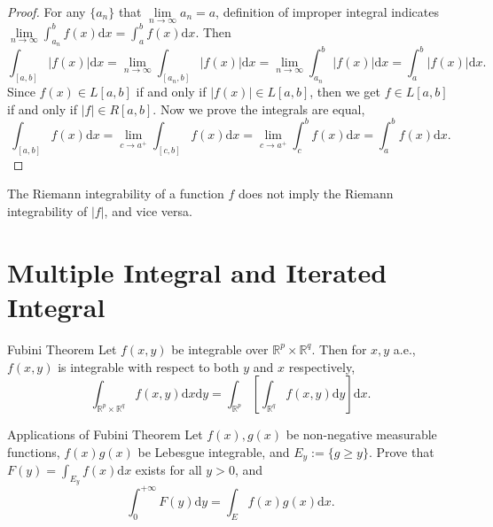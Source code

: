\begin{proof}
  For any $\{a_n\}$ that $\lim \limits _{n \rightarrow \infty} a_n = a$,
  definition of improper integral indicates
  $\lim \limits _{n \rightarrow \infty} \int_{a_n}^b f(x)\mathrm{d} x = \int_a^b f(x)\mathrm{d} x$.
  Then
  \begin{equation}
    \int_{[a, b]} |f(x)|\mathrm{d} x = \lim \limits _{n \rightarrow \infty} \int_{[a_n, b]} |f(x)|\mathrm{d} x
    = \lim \limits _{n \rightarrow \infty} \int_{a_n}^b |f(x)|\mathrm{d} x = \int_a^b |f(x)| \mathrm{d} x.
  \end{equation}
  Since $f(x) \in L[a, b]$ if and only if $|f(x)| \in L[a, b]$, then we get $f \in L[a,b]$ if and only if $|f| \in R[a,b]$.
  Now we prove the integrals are equal,
  \begin{equation}
    \int_{[a,b]}f(x)\mathrm{d} x= \lim \limits _{c \rightarrow a^+} \int_{[c,b]}f(x)\mathrm{d} x
    = \lim \limits _{c \rightarrow a^+}\int_c^b f(x)\mathrm{d} x = \int_a^b f(x)\mathrm{d} x.
  \end{equation}
\end{proof}

\begin{note}
  The Riemann integrability of a function $f$ does not imply the Riemann integrability of $|f|$,
  and vice versa.
\end{note}

\section{Multiple Integral and Iterated Integral}

\begin{theorem}{Fubini Theorem}{}
  Let $f(x, y)$ be integrable over $\mathbb{R}^p \times \mathbb{R}^q$. Then
  for $x, y$ a.e., $f(x,y)$ is integrable with respect to both $y$ and $x$
  respectively,
  \begin{equation}
    \int_{\mathbb{R}^p \times \mathbb{R}^q} f(x,y)\mathrm{d} x\mathrm{d}y 
    = \int_{\mathbb{R}^p} \left[ \int_{\mathbb{R}^q} f(x,y)\mathrm{d} y \right]\mathrm{d} x.
  \end{equation}
\end{theorem}

\begin{example}{Applications of Fubini Theorem}{}
  Let $f(x), g(x)$ be non-negative measurable functions, $f(x)g(x)$ be Lebesgue integrable,
  and $E_y := \{g \geq y\}$.
  Prove that $F(y) = \int_{E_y} f(x)\mathrm{d} x$ exists for all $y > 0$, and
  \begin{equation}
    \int_0^{+\infty} F(y) \mathrm{d} y = \int_E f(x) g(x) \mathrm{d} x.
  \end{equation}
\end{example}

